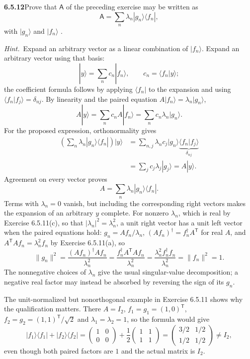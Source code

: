 \par\bigskip
\noindent\textbf{6.5.12}\quad Prove that $\mathsf{A}$ of the preceding
exercise may be written as
\[
\mathsf{A}=\sum_{n}\lambda_{n}|g_{n}\rangle\langle f_{n}|,
\]
with  $|g_{n}\rangle$ and
$|f_{n}\rangle$ .

\emph{Hint.}~Expand an arbitrary vector as a linear combination of
$|f_{n}\rangle$.
\solution
{}
Expand an arbitrary vector using that basis:
\[
|y\rangle=\sum_n c_n|f_n\rangle,
\qquad c_n=\langle f_n|y\rangle;
\]
the coefficient formula follows by applying $\langle f_n|$ to the
expansion and using $\langle f_n|f_j\rangle=\delta_{nj}$.
By linearity and the paired equation $A|f_n\rangle=\lambda_n|g_n\rangle$,
\[
A|y\rangle=\sum_n c_nA|f_n\rangle=\sum_n c_n\lambda_n|g_n\rangle.
\]
For the proposed expression, orthonormality gives
\begin{align*}
\left(\sum_n\lambda_n|g_n\rangle\langle f_n|\right)|y\rangle
&=\sum_{n,j}\lambda_n c_j|g_n\rangle
 \underbrace{\langle f_n|f_j\rangle}_{\delta_{nj}}\\
&=\sum_j c_j\lambda_j|g_j\rangle=A|y\rangle.
\end{align*}
Agreement on every vector proves
\[
\boxed{A=\sum_n\lambda_n|g_n\rangle\langle f_n|.}
\]
Terms with $\lambda_n=0$ vanish, but including the corresponding right
vectors makes the expansion of an arbitrary $y$ complete.
For nonzero $\lambda_n$, which is real by Exercise 6.5.11(c), so that
$|\lambda_n|^2=\lambda_n^2$, a unit right vector has a unit left vector
when the paired equations hold: $g_n=Af_n/\lambda_n$, $(Af_n)^\dagger
=f_n^\dagger A^{\mathsf T}$ for real $A$, and
$A^{\mathsf T}Af_n=\lambda_n^2f_n$ by Exercise 6.5.11(a), so
\[
\|g_n\|^2
=\frac{(Af_n)^\dagger Af_n}{\lambda_n^2}
=\frac{f_n^\dagger A^{\mathsf T}Af_n}{\lambda_n^2}
=\frac{\lambda_n^2f_n^\dagger f_n}{\lambda_n^2}
=\|f_n\|^2=1.
\]
The nonnegative choices of $\lambda_n$ give the usual singular-value
decomposition; a negative real factor may instead be absorbed by
reversing the sign of its $g_n$.

The unit-normalized but nonorthogonal example in Exercise 6.5.11 shows
why the qualification matters. There $A=I_2$, $f_1=g_1=(1,0)^{\mathsf T}$,
$f_2=g_2=(1,1)^{\mathsf T}/\sqrt2$ and $\lambda_1=\lambda_2=1$, so the
formula would give
\[
|f_1\rangle\langle f_1|+|f_2\rangle\langle f_2|
=\begin{pmatrix}1&0\\0&0\end{pmatrix}
 +\frac12\begin{pmatrix}1&1\\1&1\end{pmatrix}
=\begin{pmatrix}3/2&1/2\\1/2&1/2\end{pmatrix}\ne I_2,
\]
even though both paired factors are $1$ and the actual matrix is $I_2$.

